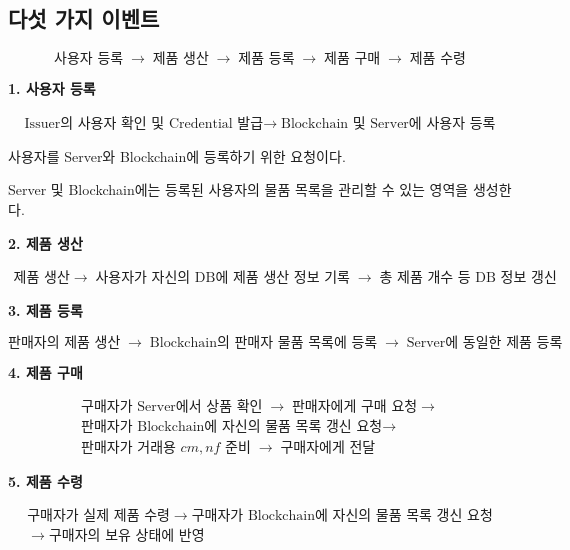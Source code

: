 \documentclass[11pt,a4paper]{extarticle}
\begin{document}
\subsection{다섯 가지 이벤트}

\[
  \boxed{\text{사용자 등록}}
  \;\longrightarrow\;
  \boxed{\text{제품 생산}}
  \;\longrightarrow\;
  \boxed{\text{제품 등록}}
  \;\longrightarrow\;
  \boxed{\text{제품 구매}}
  \;\longrightarrow\;
  \boxed{\text{제품 수령}}
\]

\textbf{1. 사용자 등록}

\[
  \begin{gathered}
    \text{Issuer의 사용자 확인 및 Credential 발급}
    \longrightarrow\;
    \text{Blockchain 및 Server에 사용자 등록}
  \end{gathered}
\]

사용자를 Server와 Blockchain에 등록하기 위한 요청이다.

Server 및 Blockchain에는 등록된 사용자의 물품 목록을 관리할 수 있는 영역을 생성한다.

\textbf{2. 제품 생산}

\[
  \begin{gathered}
    \text{제품 생산}
    \longrightarrow\;
    \text{사용자가 자신의 DB에 제품 생산 정보 기록}
    \;\longrightarrow\;
    \text{총 제품 개수 등 DB 정보 갱신}
  \end{gathered}
\]

\textbf{3. 제품 등록}

\[
  \text{판매자의 제품 생산}
  \;\longrightarrow\;
  \text{Blockchain의 판매자 물품 목록에 등록}
  \;\longrightarrow\;
  \text{Server에 동일한 제품 등록}
\]

\textbf{4. 제품 구매}

\[
  \begin{gathered}
    \text{구매자가 Server에서 상품 확인}
    \;\longrightarrow\;
    \text{판매자에게 구매 요청}
    \longrightarrow \\
    \text{판매자가 Blockchain에 자신의 물품 목록 갱신 요청}
    \longrightarrow \\
    \text{판매자가 거래용 }cm,nf\text{ 준비}
    \;\longrightarrow\;
    \text{구매자에게 전달}
  \end{gathered}
\]

\textbf{5. 제품 수령}

\[
  \begin{gathered}
    \text{구매자가 실제 제품 수령}
    \;\longrightarrow\;
    \text{구매자가 Blockchain에 자신의 물품 목록 갱신 요청} \\
    \;\longrightarrow\;
    \text{구매자의 보유 상태에 반영}
  \end{gathered}
\]
\end{document}
